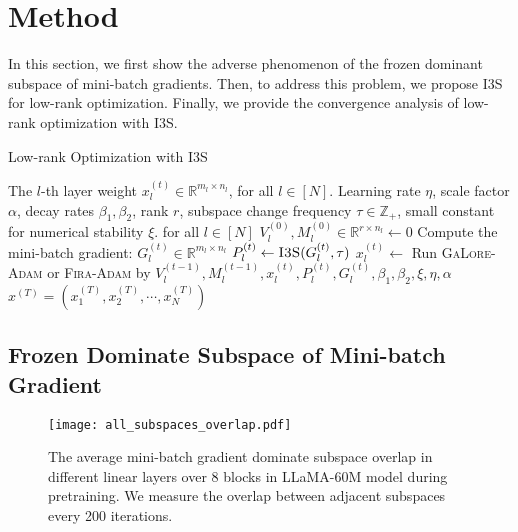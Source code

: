 \section{Method} 
\label{sec:method}
In this section, we first show the adverse phenomenon of the frozen dominant subspace of mini-batch gradients. Then, to address this problem, we propose I3S for low-rank optimization. Finally, we provide the convergence analysis of low-rank optimization with I3S.


\begin{algorithm}[!ht]
   \caption{Low-rank Optimization with I3S}
   \label{alg:low_rank_adam_v1}
 \begin{algorithmic}[1]
    The $l$-th layer weight $x_l^{(t)} \in \mathbb{R}^{m_l\times n_l}$, for all $l \in [N]$. Learning rate $\eta$, scale factor $\alpha$, decay rates $\beta_1, \beta_2$, rank $r$, subspace change frequency $\tau \in \mathbb{Z}_+$, small constant for numerical stability $\xi$.
    for all $l \in [N]$ $V_l^{(0)}, M_l^{(0)} \in \mathbb{R}^{r \times n_l} \gets 0$
   \STATE Compute the mini-batch gradient: $G_l^{(t)} \in \mathbb{R}^{m_l \times n_l}$ 
   \STATE $P_l^{(t)} \gets \textsc{I3S}(G_l^{(t)}, \tau)$ \hfill {}
   \STATE $x_l^{(t)} \gets$ Run \textsc{GaLore-Adam} or \textsc{Fira-Adam} by $V_l^{(t - 1)}, M_l^{(t - 1)}, x_l^{(t)}, P_l^{(t)}, G_l^{(t)}, \beta_1, \beta_2, \xi, \eta, \alpha$ \hfill {}
   \ENDFOR
   \ENDFOR
    $x^{(T)} = (x_1^{(T)}, x_2^{(T)}, \cdots, x_N^{(T)} )$
 \end{algorithmic}
\end{algorithm}


\subsection{Frozen Dominate Subspace of Mini-batch Gradient}

\begin{figure}[!ht]
    \centering
    \texttt{[image: all\_subspaces\_overlap.pdf]}
    \caption{The average mini-batch gradient dominate subspace overlap in different linear layers over 8 blocks in LLaMA-60M model during pretraining. We measure the overlap between adjacent subspaces every 200 iterations.}
    \label{fig:q-galore}
\end{figure} 

